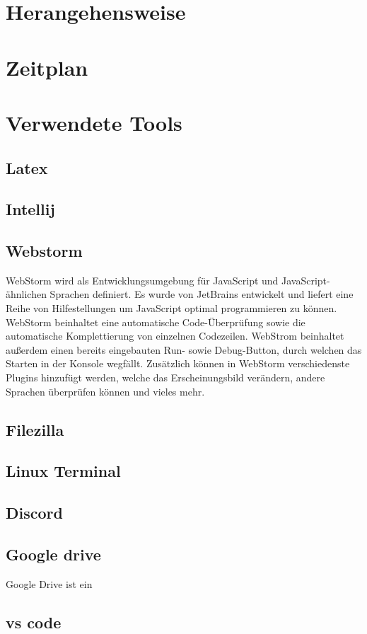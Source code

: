 \section{Herangehensweise}


\section{Zeitplan}


\section{Verwendete Tools}



\subsection{Latex}
\subsection{Intellij}

\subsection{Webstorm}
WebStorm wird als Entwicklungsumgebung für JavaScript und JavaScript-ähnlichen Sprachen definiert. Es wurde von JetBrains entwickelt und liefert eine Reihe von Hilfestellungen um JavaScript optimal programmieren zu können. WebStorm beinhaltet eine automatische Code-Überprüfung sowie die automatische Komplettierung von einzelnen Codezeilen. WebStrom beinhaltet außerdem einen bereits eingebauten Run- sowie Debug-Button, durch welchen das Starten in der Konsole wegfällt. Zusätzlich können in WebStorm verschiedenste Plugins hinzufügt werden, welche das Erscheinungsbild verändern, andere Sprachen überprüfen können und vieles mehr.     

\subsection{Filezilla}
\subsection{Linux Terminal}
\subsection{Discord}
\subsection{Google drive}
Google Drive ist ein 

\subsection{vs code}